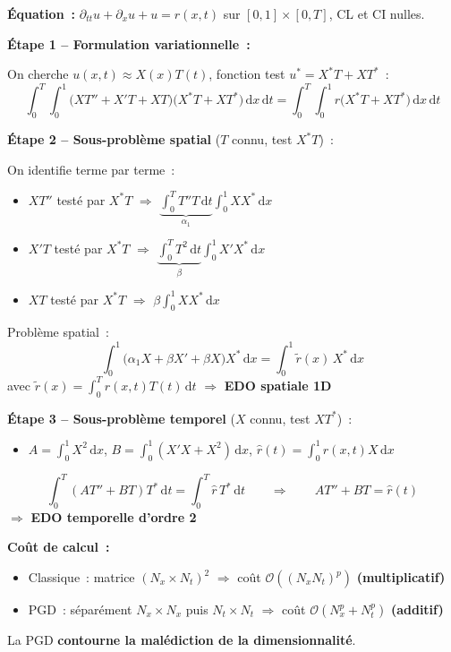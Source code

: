 \documentclass[11pt,a4paper]{article}
\begin{document}
\begin{formulabox}
\textbf{\'Equation~:} $\partial_{tt}u + \partial_x u + u = r(x,t)$ sur $[0,1]\times[0,T]$, CL et CI nulles.

\medskip
\textbf{\'Etape 1 -- Formulation variationnelle~:}

On cherche $u(x,t) \approx X(x)T(t)$, fonction test $u^* = X^*T + XT^*$~:
\[
\int_0^T\!\!\int_0^1 \big(XT'' + X'T + XT\big)\big(X^*T + XT^*\big)\,\mathrm{d}x\,\mathrm{d}t = \int_0^T\!\!\int_0^1 r\big(X^*T + XT^*\big)\,\mathrm{d}x\,\mathrm{d}t
\]

\textbf{\'Etape 2 -- Sous-probl\`eme spatial} ($T$ connu, test $X^*T$)~:

On identifie terme par terme~:
\begin{itemize}[nosep]
\item $XT''$ test\'e par $X^*T$ $\Rightarrow$ $\displaystyle\underbrace{\int_0^T T''T\,\mathrm{d}t}_{\alpha_1}\int_0^1 XX^*\,\mathrm{d}x$
\item $X'T$ test\'e par $X^*T$ $\Rightarrow$ $\displaystyle\underbrace{\int_0^T T^2\,\mathrm{d}t}_{\beta}\int_0^1 X'X^*\,\mathrm{d}x$
\item $XT$ test\'e par $X^*T$ $\Rightarrow$ $\displaystyle\beta\int_0^1 XX^*\,\mathrm{d}x$
\end{itemize}
Probl\`eme spatial~:
\[
\boxed{\int_0^1\big(\alpha_1 X + \beta X' + \beta X\big)X^*\,\mathrm{d}x = \int_0^1 \tilde{r}(x)\,X^*\,\mathrm{d}x}
\]
avec $\tilde{r}(x) = \int_0^T r(x,t)T(t)\,\mathrm{d}t$ $\Rightarrow$ \textbf{EDO spatiale 1D}

\medskip
\textbf{\'Etape 3 -- Sous-probl\`eme temporel} ($X$ connu, test $XT^*$)~:

\begin{itemize}[nosep]
\item $A = \int_0^1 X^2\,\mathrm{d}x$, \quad $B = \int_0^1(X'X + X^2)\,\mathrm{d}x$, \quad $\hat{r}(t) = \int_0^1 r(x,t)X\,\mathrm{d}x$
\end{itemize}
\[
\boxed{\int_0^T (AT'' + BT)T^*\,\mathrm{d}t = \int_0^T \hat{r}\,T^*\,\mathrm{d}t} \qquad\Rightarrow\qquad AT'' + BT = \hat{r}(t)
\]
$\Rightarrow$ \textbf{EDO temporelle d'ordre 2}

\medskip
\textbf{Co\^ut de calcul~:}
\begin{itemize}[nosep]
\item Classique~: matrice $(N_x\!\times\!N_t)^2$ $\Rightarrow$ co\^ut $\mathcal{O}((N_xN_t)^p)$ \textbf{(multiplicatif)}
\item PGD~: s\'epar\'ement $N_x\!\times\!N_x$ puis $N_t\!\times\!N_t$ $\Rightarrow$ co\^ut $\mathcal{O}(N_x^p + N_t^p)$ \textbf{(additif)}
\end{itemize}
La PGD \textbf{contourne la mal\'ediction de la dimensionnalit\'e}.
\end{formulabox}
\end{document}
